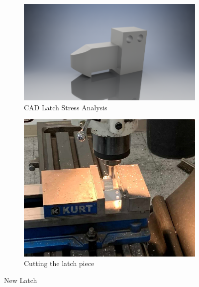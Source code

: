 \documentclass{article}
\begin{document}
\begin{figure}[h!]
\centering
\begin{subfigure}{.5\textwidth}
  \centering
  \includegraphics[width=\textwidth,]{27_03-04/images/latchCAD.png}
  \caption{CAD Latch Stress Analysis}
  \label{fig:Latch}
 \end{subfigure}
\begin{subfigure}{.35\textwidth}
  \centering
  \includegraphics[width=\textwidth]{27_03-04/images/latchcut.jpg}
  \caption{Cutting the latch piece}
  \label{fig:Latchcut}
  \end{subfigure}
  \caption{New Latch}
  \end{figure}
\end{document}
